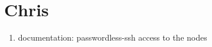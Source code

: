 \section{Chris}

\begin{enumerate}
\item documentation: passwordless-ssh access to the nodes
\end{enumerate}